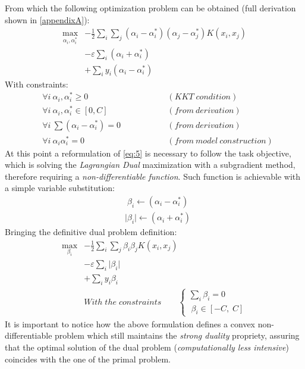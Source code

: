 \documentclass[12pt]{article}
\newcommand{\abs}[1]{\lvert#1\rvert}
\begin{document}
	From which the following optimization problem can be obtained (full derivation shown in \ref{appendixA}):
	\begin{equation}\label{eq:5}
    	\begin{aligned}
    		\max_{\alpha_i,\alpha_i^*} &- \frac{1}{2}\sum_i\sum_j(\alpha_i - \alpha_i^*)(\alpha_j - \alpha_j^*)K(x_i,x_j) \\
    		&- \varepsilon\sum_i(\alpha_i + \alpha_i^*)\\
    		&+ \sum_i y_i(\alpha_i - \alpha_i^*)
    	\end{aligned}
	\end{equation}
	With constraints:
	\begin{subequations}
		\begin{align}
    		&\forall i \: \alpha_i,\alpha_i^* \geq 0 \qquad\qquad &&(KKT\;condition) \label{eq:6a}\\
    		&\forall i \: \alpha_i,\alpha_i^* \in [0,C]  \qquad\qquad &&(from \: derivation)\label{eq:6b}\\
    		&\forall i \: \sum (\alpha_i - \alpha_i^*) = 0 \qquad\qquad &&(from \: derivation)\label{eq:6c}\\
    		&\forall i \: \alpha_i \alpha_i^* = 0 \qquad\qquad &&(from \: model \: construction)\label{eq:6d}
		\end{align}
	\end{subequations}
	\newline
	At this point a reformulation of \eqref{eq:5} is necessary to follow the task objective, which is solving the \textit{Lagrangian Dual} maximization with a subgradient method, therefore requiring a \textit{non-differentiable function}. Such function is achievable with a simple variable substitution:
	\begin{equation*}
	    \begin{aligned}
    	    &\;\beta_i \longleftarrow (\alpha_i - \alpha_i^*) \\
    	    &\abs{\beta_i} \longleftarrow (\alpha_i + \alpha_i^*)
	    \end{aligned}
	\end{equation*}
	Bringing the definitive dual problem definition:
	\begin{equation}\label{eq:7}
	    \begin{aligned}
    	    \max_{\beta_i} &- \frac{1}{2}\sum_i \sum_j \beta_i \beta_j K(x_i,x_j) \\
    		&- \varepsilon\sum_i\abs{\beta_i}\\
    		&+ \sum_i y_i\beta_i\\
    		&With\;the\;constraints\qquad
            \begin{cases}
                \sum_i \beta_i = 0 \\
                \;\beta_i\in[-C,\;C] 
            \end{cases}
        \end{aligned}
	\end{equation}
	It is important to notice how the above formulation defines a convex non-differentiable problem which still maintains the \textit{strong duality} propriety, assuring that the optimal solution of the dual problem (\textit{computationally less intensive}) coincides with the one of the primal problem.
	\pagebreak
\end{document}
